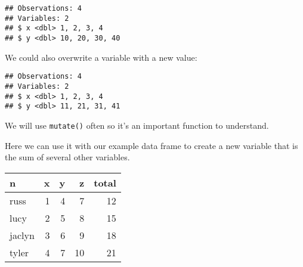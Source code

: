 \documentclass[12pt,]{book}
\newenvironment{Shaded}{\begin{snugshade}}{\end{snugshade}}
\newcommand{\CommentTok}[1]{\textcolor[rgb]{0.56,0.35,0.01}{\textit{#1}}}
\newcommand{\DataTypeTok}[1]{\textcolor[rgb]{0.13,0.29,0.53}{#1}}
\newcommand{\DecValTok}[1]{\textcolor[rgb]{0.00,0.00,0.81}{#1}}
\newcommand{\KeywordTok}[1]{\textcolor[rgb]{0.13,0.29,0.53}{\textbf{#1}}}
\newcommand{\NormalTok}[1]{#1}
\newcommand{\OperatorTok}[1]{\textcolor[rgb]{0.81,0.36,0.00}{\textbf{#1}}}
\newcommand{\StringTok}[1]{\textcolor[rgb]{0.31,0.60,0.02}{#1}}
\begin{document}
\begin{verbatim}
## Observations: 4
## Variables: 2
## $ x <dbl> 1, 2, 3, 4
## $ y <dbl> 10, 20, 30, 40
\end{verbatim}

We could also overwrite a variable with a new value:

\begin{Shaded}
\end{Shaded}

\begin{verbatim}
## Observations: 4
## Variables: 2
## $ x <dbl> 1, 2, 3, 4
## $ y <dbl> 11, 21, 31, 41
\end{verbatim}

We will use \texttt{mutate()} often so it's an important function to understand.

Here we can use it with our example data frame to create a new variable that is the sum of several other variables.

\begin{Shaded}
\end{Shaded}

\begin{tabular}{l|r|r|r|r}
\hline
n & x & y & z & total\\
\hline
russ & 1 & 4 & 7 & 12\\
\hline
lucy & 2 & 5 & 8 & 15\\
\hline
jaclyn & 3 & 6 & 9 & 18\\
\hline
tyler & 4 & 7 & 10 & 21\\
\hline
\end{tabular}
\end{document}
